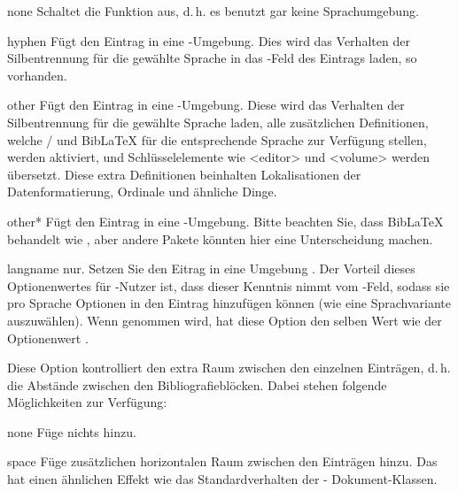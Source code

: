 \documentclass{ltxdockit}[2011/03/25]
\newcommand*{\biblatex}{BibLaTeX\xspace}
\begin{document}
\begin{optionlist}
\begin{valuelist}

\item[none] Schaltet die Funktion aus, d.\,h. es benutzt gar keine Sprachumgebung.

\item[hyphen] Fügt den Eintrag in eine -Umgebung. Dies wird das
Verhalten der Silbentrennung für die gewählte Sprache in das
-Feld des Eintrags laden, so vorhanden.

\item[other] Fügt den Eintrag in eine -Umgebung. Diese wird
das Verhalten der Silbentrennung für die gewählte Sprache laden, alle
zusätzlichen Definitionen, welche / und \biblatex für die
entsprechende Sprache zur Verfügung stellen, werden aktiviert, und
Schlüsselelemente wie <editor> und <volume> werden übersetzt. Diese extra
Definitionen beinhalten Lokalisationen der Datenformatierung, Ordinale und
ähnliche Dinge.

\item[other*] Fügt den Eintrag in eine -Umgebung. Bitte
beachten Sie, dass \biblatex {} behandelt wie
, aber andere Pakete könnten hier eine Unterscheidung machen.

\item[langname]
 nur. Setzen Sie den Eitrag in eine Umgebung . 
Der Vorteil dieses Optionenwertes für -Nutzer ist, dass dieser Kenntnis nimmt vom -Feld, sodass sie pro Sprache Optionen in den Eintrag hinzufügen können (wie eine Sprachvariante auszuwählen). Wenn  genommen wird, 
hat diese Option den selben Wert wie der Optionenwert .

\end{valuelist}


Diese Option kontrolliert den extra Raum zwischen den einzelnen Einträgen,
d.\,h. die Abstände zwischen den Bibliografieblöcken. Dabei stehen folgende
Möglichkeiten zur Verfügung:

\begin{valuelist}

\item[none] Füge nichts hinzu.

\item[space] Füge zusätzlichen horizontalen Raum zwischen den Einträgen hinzu.
Das hat einen ähnlichen Effekt wie das Standardverhalten der \latex-
Dokument-Klassen.


\end{valuelist}
\end{optionlist}
\end{document}

